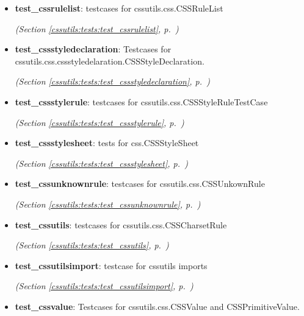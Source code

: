 \begin{itemize}
\begin{itemize}
    \item \textbf{test\_cssrulelist}: testcases for cssutils.css.CSSRuleList



  \textit{(Section \ref{cssutils:tests:test_cssrulelist}, p.~\pageref{cssutils:tests:test_cssrulelist})}

    \item \textbf{test\_cssstyledeclaration}: Testcases for cssutils.css.cssstyledelaration.CSSStyleDeclaration.



  \textit{(Section \ref{cssutils:tests:test_cssstyledeclaration}, p.~\pageref{cssutils:tests:test_cssstyledeclaration})}

    \item \textbf{test\_cssstylerule}: testcases for cssutils.css.CSSStyleRuleTestCase



  \textit{(Section \ref{cssutils:tests:test_cssstylerule}, p.~\pageref{cssutils:tests:test_cssstylerule})}

    \item \textbf{test\_cssstylesheet}: tests for css.CSSStyleSheet



  \textit{(Section \ref{cssutils:tests:test_cssstylesheet}, p.~\pageref{cssutils:tests:test_cssstylesheet})}

    \item \textbf{test\_cssunknownrule}: testcases for cssutils.css.CSSUnkownRule



  \textit{(Section \ref{cssutils:tests:test_cssunknownrule}, p.~\pageref{cssutils:tests:test_cssunknownrule})}

    \item \textbf{test\_cssutils}: testcases for cssutils.css.CSSCharsetRule



  \textit{(Section \ref{cssutils:tests:test_cssutils}, p.~\pageref{cssutils:tests:test_cssutils})}

    \item \textbf{test\_cssutilsimport}: testcase for cssutils imports



  \textit{(Section \ref{cssutils:tests:test_cssutilsimport}, p.~\pageref{cssutils:tests:test_cssutilsimport})}

    \item \textbf{test\_cssvalue}: Testcases for cssutils.css.CSSValue and CSSPrimitiveValue.




\end{itemize}
\end{itemize}
